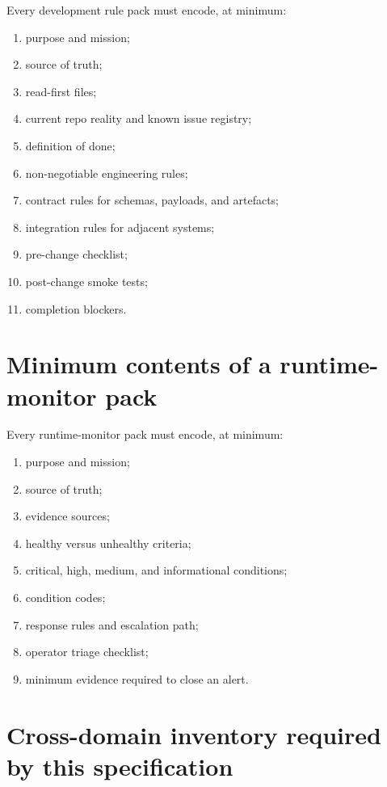 Every development rule pack must encode, at minimum:
\begin{enumerate}
  \item purpose and mission;
  \item source of truth;
  \item read-first files;
  \item current repo reality and known issue registry;
  \item definition of done;
  \item non-negotiable engineering rules;
  \item contract rules for schemas, payloads, and artefacts;
  \item integration rules for adjacent systems;
  \item pre-change checklist;
  \item post-change smoke tests;
  \item completion blockers.
\end{enumerate}

\section{Minimum contents of a runtime-monitor pack}

Every runtime-monitor pack must encode, at minimum:
\begin{enumerate}
  \item purpose and mission;
  \item source of truth;
  \item evidence sources;
  \item healthy versus unhealthy criteria;
  \item critical, high, medium, and informational conditions;
  \item condition codes;
  \item response rules and escalation path;
  \item operator triage checklist;
  \item minimum evidence required to close an alert.
\end{enumerate}

\section{Cross-domain inventory required by this specification}

